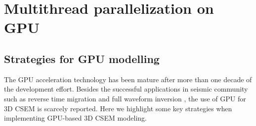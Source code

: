 \documentclass[a4paper,10pt]{article}
\begin{document}
  
\section{Multithread parallelization on GPU}

\subsection{Strategies for GPU modelling}

The GPU acceleration technology has been mature after more than one decade of the development effort. Besides the successful applications in seismic community such as reverse time migration and full waveform inversion \citep{Yang_2014_RTM,Yang_2015_GPU}, the use of GPU for 3D CSEM is scarcely reported. Here we highlight some key strategies when implementing GPU-based 3D CSEM modeling.
\end{document}
